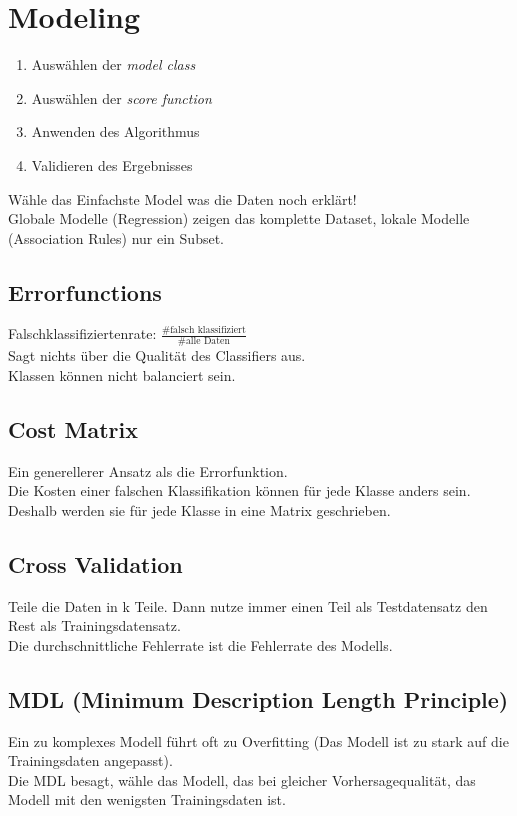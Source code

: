 \documentclass[a4paper]{scrartcl}
\begin{document}
\section{Modeling}
\begin{enumerate}
\item Auswählen der \textit{model class}
\item Auswählen der \textit{score function}
\item Anwenden des Algorithmus
\item Validieren des Ergebnisses
\end{enumerate}
Wähle das Einfachste Model was die Daten noch erklärt!\\
Globale Modelle (Regression) zeigen das komplette Dataset, lokale Modelle (Association Rules) nur ein Subset.\\

\subsection{Errorfunctions}
Falschklassifiziertenrate: $\frac{\#\mbox{falsch klassifiziert}}{\#\mbox{alle Daten}}$\\
Sagt nichts über die Qualität des Classifiers aus.\\
Klassen können nicht balanciert sein.\\

\subsection{Cost Matrix}
Ein generellerer Ansatz als die Errorfunktion.\\
Die Kosten einer falschen Klassifikation können für jede Klasse anders sein.\\
Deshalb werden sie für jede Klasse in eine Matrix geschrieben.\\

\subsection{Cross Validation}
Teile die Daten in k Teile. Dann nutze immer einen Teil als Testdatensatz den Rest als Trainingsdatensatz.\\
Die durchschnittliche Fehlerrate ist die Fehlerrate des Modells.\\
\subsection{MDL (Minimum Description Length Principle)}
Ein zu komplexes Modell führt oft zu Overfitting (Das Modell ist zu stark auf die Trainingsdaten angepasst).\\ 
Die MDL besagt, wähle das Modell, das bei gleicher Vorhersagequalität, das Modell mit den wenigsten Trainingsdaten ist.
\end{document}
